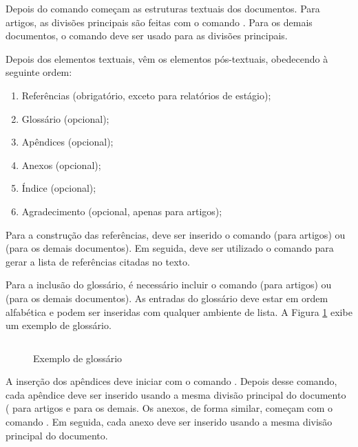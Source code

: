 \documentclass[artigo]{iftex2024}
\newcommand{\ElaboradoAutor}{Elaborado pelo autor, 2024.}
\begin{document}
Depois do comando  começam as estruturas textuais dos documentos.
Para artigos, as divisões principais são feitas com o comando .
Para os demais documentos, o comando  deve ser usado para as divisões principais.

Depois dos elementos textuais, vêm os elementos pós-textuais, obedecendo à seguinte ordem:
\begin{enumerate}
 \item Referências (obrigatório, exceto para relatórios de estágio);
 \item Glossário (opcional);
 \item Apêndices (opcional);
 \item Anexos (opcional);
 \item Índice (opcional);
 \item Agradecimento (opcional, apenas para artigos);
\end{enumerate}

Para a construção das referências, deve ser inserido o comando  (para artigos) ou  (para os demais documentos).
Em seguida, deve ser utilizado o comando  para gerar a lista de referências citadas no texto.

Para a inclusão do glossário, é necessário incluir o comando  (para artigos) ou  (para os demais documentos).
As entradas do glossário deve estar em ordem alfabética e podem ser inseridas com qualquer ambiente de lista.
A Figura \ref{fig:exemplo_glossario} exibe um exemplo de glossário.

\begin{figure}[!htb] \centering
\caption{Exemplo de glossário} \label{fig:exemplo_glossario}
\begin{varwidth}{\linewidth}
\inputminted{latex}{figuras/exemplo_glossario.tex}
\vspace{-1em}
\legend{\ElaboradoAutor}
\end{varwidth}
\end{figure}

A inserção dos apêndices deve iniciar com o comando .
Depois desse comando, cada apêndice deve ser inserido usando a mesma divisão principal do documento ( para artigos e  para os demais.
Os anexos, de forma similar, começam com o comando .
Em seguida, cada anexo deve ser inserido usando a mesma divisão principal do documento.
\end{document}

